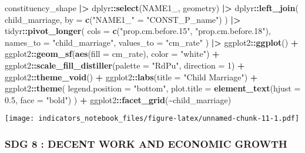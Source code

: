 \documentclass[
]{article}
\newenvironment{Shaded}{\begin{snugshade}}{\end{snugshade}}
\newcommand{\AttributeTok}[1]{\textcolor[rgb]{0.13,0.29,0.53}{#1}}
\newcommand{\DecValTok}[1]{\textcolor[rgb]{0.00,0.00,0.81}{#1}}
\newcommand{\FloatTok}[1]{\textcolor[rgb]{0.00,0.00,0.81}{#1}}
\newcommand{\FunctionTok}[1]{\textcolor[rgb]{0.13,0.29,0.53}{\textbf{#1}}}
\newcommand{\NormalTok}[1]{#1}
\newcommand{\OtherTok}[1]{\textcolor[rgb]{0.56,0.35,0.01}{#1}}
\newcommand{\SpecialCharTok}[1]{\textcolor[rgb]{0.81,0.36,0.00}{\textbf{#1}}}
\newcommand{\StringTok}[1]{\textcolor[rgb]{0.31,0.60,0.02}{#1}}
\begin{document}
\begin{Shaded}
\begin{Highlighting}[]
\NormalTok{constituency\_shape }\SpecialCharTok{|\textgreater{}}
\NormalTok{  dplyr}\SpecialCharTok{::}\FunctionTok{select}\NormalTok{(NAME1\_, geometry) }\SpecialCharTok{|\textgreater{}}
\NormalTok{  dplyr}\SpecialCharTok{::}\FunctionTok{left\_join}\NormalTok{(}
\NormalTok{    child\_marriage,}
    \AttributeTok{by =} \FunctionTok{c}\NormalTok{(}\StringTok{"NAME1\_"} \OtherTok{=} \StringTok{"CONST\_P\_name"}\NormalTok{)}
\NormalTok{  ) }\SpecialCharTok{|\textgreater{}}
\NormalTok{  tidyr}\SpecialCharTok{::}\FunctionTok{pivot\_longer}\NormalTok{(}
    \AttributeTok{cols =} \FunctionTok{c}\NormalTok{(}\StringTok{"prop.cm.before.15"}\NormalTok{, }\StringTok{"prop.cm.before.18"}\NormalTok{),}
    \AttributeTok{names\_to =} \StringTok{"child\_marriage"}\NormalTok{,}
    \AttributeTok{values\_to =} \StringTok{"cm\_rate"}
\NormalTok{  ) }\SpecialCharTok{|\textgreater{}}
\NormalTok{  ggplot2}\SpecialCharTok{::}\FunctionTok{ggplot}\NormalTok{() }\SpecialCharTok{+}
\NormalTok{  ggplot2}\SpecialCharTok{::}\FunctionTok{geom\_sf}\NormalTok{(}\FunctionTok{aes}\NormalTok{(}\AttributeTok{fill =}\NormalTok{ cm\_rate), }\AttributeTok{color =} \StringTok{"white"}\NormalTok{) }\SpecialCharTok{+}
\NormalTok{  ggplot2}\SpecialCharTok{::}\FunctionTok{scale\_fill\_distiller}\NormalTok{(}\AttributeTok{palette =} \StringTok{"RdPu"}\NormalTok{, }\AttributeTok{direction =} \DecValTok{1}\NormalTok{) }\SpecialCharTok{+}
\NormalTok{  ggplot2}\SpecialCharTok{::}\FunctionTok{theme\_void}\NormalTok{() }\SpecialCharTok{+}
\NormalTok{  ggplot2}\SpecialCharTok{::}\FunctionTok{labs}\NormalTok{(}\AttributeTok{title =} \StringTok{"Child Marriage"}\NormalTok{) }\SpecialCharTok{+}
\NormalTok{  ggplot2}\SpecialCharTok{::}\FunctionTok{theme}\NormalTok{(}
    \AttributeTok{legend.position =} \StringTok{"bottom"}\NormalTok{,}
    \AttributeTok{plot.title =} \FunctionTok{element\_text}\NormalTok{(}\AttributeTok{hjust =} \FloatTok{0.5}\NormalTok{, }\AttributeTok{face =} \StringTok{"bold"}\NormalTok{)}
\NormalTok{  ) }\SpecialCharTok{+}
\NormalTok{  ggplot2}\SpecialCharTok{::}\FunctionTok{facet\_grid}\NormalTok{(}\SpecialCharTok{\textasciitilde{}}\NormalTok{child\_marriage)}
\end{Highlighting}
\end{Shaded}

\texttt{[image: indicators\_notebook\_files/figure-latex/unnamed-chunk-11-1.pdf]}

\subsubsection{SDG 8 : DECENT WORK AND ECONOMIC
GROWTH}\label{sdg-8-decent-work-and-economic-growth}
\end{document}
